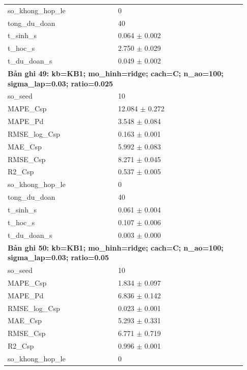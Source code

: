 \begin{longtable}{p{0.43\linewidth}p{0.50\linewidth}}
so\_\allowbreak khong\_\allowbreak hop\_\allowbreak le & 0 \\
tong\_\allowbreak du\_\allowbreak doan & 40 \\
t\_\allowbreak sinh\_\allowbreak s & 0.064 $\pm$ 0.002 \\
t\_\allowbreak hoc\_\allowbreak s & 2.750 $\pm$ 0.029 \\
t\_\allowbreak du\_\allowbreak doan\_\allowbreak s & 0.049 $\pm$ 0.002 \\
\midrule
\multicolumn{2}{p{0.95\linewidth}}{\textbf{Bản ghi 49: kb=KB1; mo\_hinh=ridge; cach=C; n\_ao=100; sigma\_lap=0.03; ratio=0.025}} \\
so\_\allowbreak seed & 10 \\
MAPE\_\allowbreak Csp & 12.084 $\pm$ 0.272 \\
MAPE\_\allowbreak Pd & 3.548 $\pm$ 0.084 \\
RMSE\_\allowbreak log\_\allowbreak Csp & 0.163 $\pm$ 0.001 \\
MAE\_\allowbreak Csp & 5.992 $\pm$ 0.083 \\
RMSE\_\allowbreak Csp & 8.271 $\pm$ 0.045 \\
R2\_\allowbreak Csp & 0.537 $\pm$ 0.005 \\
so\_\allowbreak khong\_\allowbreak hop\_\allowbreak le & 0 \\
tong\_\allowbreak du\_\allowbreak doan & 40 \\
t\_\allowbreak sinh\_\allowbreak s & 0.061 $\pm$ 0.004 \\
t\_\allowbreak hoc\_\allowbreak s & 0.107 $\pm$ 0.006 \\
t\_\allowbreak du\_\allowbreak doan\_\allowbreak s & 0.003 $\pm$ 0.000 \\
\midrule
\multicolumn{2}{p{0.95\linewidth}}{\textbf{Bản ghi 50: kb=KB1; mo\_hinh=ridge; cach=C; n\_ao=100; sigma\_lap=0.03; ratio=0.05}} \\
so\_\allowbreak seed & 10 \\
MAPE\_\allowbreak Csp & 1.834 $\pm$ 0.097 \\
MAPE\_\allowbreak Pd & 6.836 $\pm$ 0.142 \\
RMSE\_\allowbreak log\_\allowbreak Csp & 0.023 $\pm$ 0.001 \\
MAE\_\allowbreak Csp & 5.293 $\pm$ 0.331 \\
RMSE\_\allowbreak Csp & 6.771 $\pm$ 0.719 \\
R2\_\allowbreak Csp & 0.996 $\pm$ 0.001 \\
so\_\allowbreak khong\_\allowbreak hop\_\allowbreak le & 0 \\

\end{longtable}
